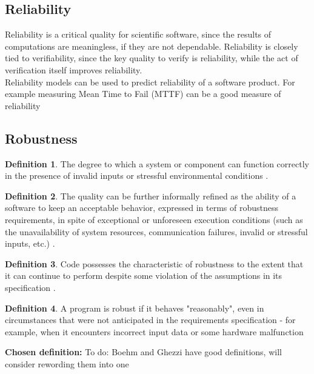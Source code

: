 \documentclass[letterpaper,cleveref]{lipics-v2019}
\theoremstyle{definition}
\newtheorem{defn}{Definition}
\begin{document}
\subsection{Reliability}

Reliability is a critical quality for scientific software, since the results of
computations are meaningless, if they are not dependable.  Reliability is
closely tied to verifiability, since the key quality to verify is reliability,
while the act of verification itself improves reliability.\\
Reliability models can be used to predict reliability of a software product. For example measuring Mean Time to Fail (MTTF) can be a good measure of reliability \cite{berander2005software}

\subsection{Robustness}
\begin{defn}
The degree to which a system or component can function correctly in the presence of invalid inputs or stressful environmental conditions \cite{IEEEStdGlossarySET1990}.\\
\end{defn}
\begin{defn}
The quality can be further informally refined as the ability of a software to keep an acceptable behavior, expressed in terms of robustness requirements, in spite of exceptional or unforeseen execution conditions (such as the unavailability of system resources, communication failures, invalid or stressful inputs, etc.) \cite{fernandez2005model}.\\
\end{defn}
\begin{defn}
Code possesses the characteristic of robustness to the extent that it can continue to perform despite some violation of the assumptions in its specification \cite{boehm2007software}.
\end{defn}
\begin{defn}
A program is robust if it behaves "reasonably", even in circumstances that were not anticipated in the requirements specification - for example, when it encounters incorrect input data or some hardware malfunction \cite{ghezzi1991fundamentals}\\
\end{defn}

\textbf{Chosen definition:}
To do: Boehm and Ghezzi have good definitions, will consider rewording them into one\\
\end{document}
